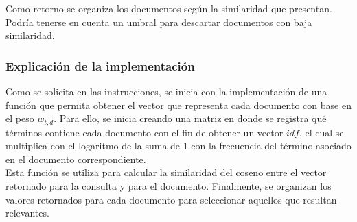 Como retorno se organiza los documentos según la similaridad que presentan. Podría tenerse en cuenta un umbral para descartar documentos con baja similaridad.

\subsubsection{Explicación de la implementación}
Como se solicita en las instrucciones, se inicia con la implementación de una función que permita obtener el vector que representa cada documento con base en el peso $w_{t,d}$. Para ello, se inicia creando una matriz en donde se registra qué términos contiene cada documento con el fin de obtener un vector $idf$, el cual se multiplica con el logaritmo de la suma de 1 con la frecuencia del término asociado en el documento correspondiente.\\

Esta función se utiliza para calcular la similaridad del coseno entre el vector retornado para la consulta y para el documento. Finalmente, se organizan los valores retornados para cada documento para seleccionar aquellos que resultan relevantes.